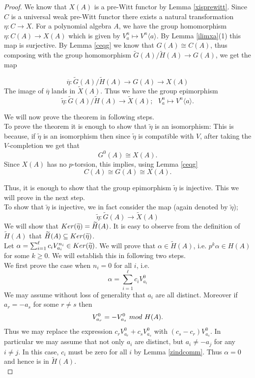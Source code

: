 \documentclass[10pt,a4paper]{amsart}
\newcommand{\Ker}{{\rm Ker  }}
\newcommand{\ab}[1]{\langle {#1} \rangle}
\renewcommand{\tilde}{\widetilde}
\begin{document}
\begin{proof}
We know that $X(A)$ is a pre-Witt functor by Lemma \ref{xisprewitt}. Since $C$ is a universal weak pre-Witt functor there exists a natural transformation $\eta: C \to X$. For a polynomial algebra $A$, we have the group homomorphism $\eta: C(A) \to X(A)$ which is given by $V^n_a \mapsto V^n\ab{a}$.  By Lemma \ref{ilimxa}(1) this map is surjective. By Lemma \ref{ceqg} we know that $G(A)\cong C(A)$, thus composing with the group homomorphism $\tilde{G}(A)/\tilde{H}(A) \to G(A)$, we get the map 
 
$$\overline{\eta}: \tilde{G}(A)/\tilde{H}(A) \to G(A) \to X(A)$$
The image of $\overline{\eta}$ lands in $\tilde{X}(A)$. Thus we have the group epimorphism 
$$\tilde{\eta}:  \tilde{G}(A)/\tilde{H}(A) \to \tilde{X}(A);  \  \ \ V^n_a \mapsto V^n\ab{a} .$$

\noindent We will now prove the theorem in following steps.\\

 To prove the theorem it is enough to show that $\tilde{\eta}$ is an isomorphism: This is because, if $\tilde{\eta}$ is an isomorphism then since $\tilde{\eta}$ is compatible with $V$, after taking the $V$-completion we get that $$G^0(A) \cong X(A).$$ Since $X(A)$ has no $p$-torsion, this implies, using Lemma \ref{ceqg} $$C(A) \cong G(A) \cong X(A).$$

\noindent Thus, it is enough to show that the group epimorphism $\tilde{\eta}$ is injective.  This we will prove in the next step.\\

 To show that $\tilde{\eta}$ is injective, we in fact consider the map (again denoted by $\tilde{\eta}$);
$$\tilde{\eta}: \tilde{G}(A) \to \tilde{X}(A)$$
We will show that $\Ker(\tilde{\eta}) = \tilde{H}(A)$. It is easy to observe from the definition of $\tilde{H}(A)$ that $\tilde{H}(A) \subseteq \Ker(\tilde{\eta})$. \\

Let  $\alpha= \sum_{i=1}^\ell c_i V^{n_i}_{a_i} \in \Ker(\tilde{\eta})$. We will prove that $\alpha\in \tilde{H}(A)$, i.e. 
$p^k \alpha \in H(A)$ for some $k \geq 0$. We will establish this in following two steps.\\

 We first prove the case when $n_i=0$ for all $i$, i.e. 
$$ \alpha = \sum_{i=1}^\ell c_iV^0_{a_i}$$ 
We may assume without loss of generality that $a_i$ are all distinct. Moreover if $a_r=-a_s$ for some $r\neq s$ then 
$$ V^0_{a_r} = - V^0_{a_s} \ {\rm  mod} \ H(A).$$ Thus we may replace the expression $c_rV^0_{a_r}+c_sV^0_{a_s}$ with  $(c_s-c_r)V^0_{a_s}$. In particular we may assume that not only $a_i$ are distinct, but $a_i\neq -a_j$ for any $i\neq j$. In this case, $c_i$ must be zero for all $i$ by Lemma \ref{zindcomm}. Thus $\alpha=0$ and hence is in $\tilde{H}(A)$. \\


\end{proof}
\end{document}
